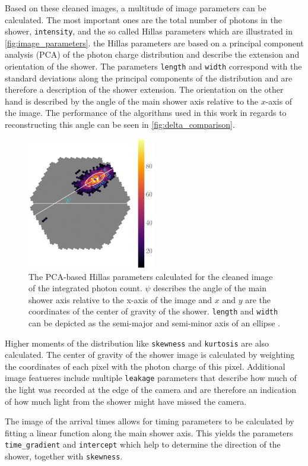 Based on these cleaned images, a multitude of image parameters can be calculated.
The most important ones are the total number of photons in the shower, \texttt{intensity}, and the so called Hillas parameters which are illustrated in \autoref{fig:image_parameters}.
the Hillas parameters are based on a principal component analysis (PCA) of the photon charge distribution and describe the extension and orientation of the shower.
The parameters \texttt{length} and \texttt{width} correspond with the standard deviations along the principal components of the distribution and are therefore a 
description of the shower extension. 
The orientation on the other hand is described by the angle of the main shower axis relative to the $x$-axis of the image.
The performance of the algorithms used in this work in regards to reconstructing this angle can be seen in \autoref{fig:delta_comparison}.
\begin{figure}
    \centering
    \includegraphics[width=0.5\textwidth]{images/image_parameters.png}
    \caption{The PCA-based Hillas parameters calculated for the cleaned image of the integrated photon count.
        $\psi$ describes the angle of the main shower axis relative to the x-axis of the image and $x$ and $y$ are the coordinates of the center of gravity of the shower. 
        \texttt{length} and \texttt{width} can be depicted as the semi-major and semi-minor axis of an ellipse \cite{lukas}.
    }
    \label{fig:image_parameters}
\end{figure}

Higher moments of the distribution like \texttt{skewness} and \texttt{kurtosis} are also calculated. 
The center of gravity of the shower image is calculated by weighting the coordinates of each pixel with the photon charge of this pixel.
Additional image featueres include multiple \texttt{leakage} parameters that describe how much of the light was recorded at the edge of the camera and are
therefore an indication of how much light from the shower might have missed the camera.

The image of the arrival times allows for timing parameters to be calculated by fitting a linear function along the main shower axis. 
This yields the parameters \texttt{time\_gradient} and \texttt{intercept} which help to determine the direction of the shower, together with \texttt{skewness}.